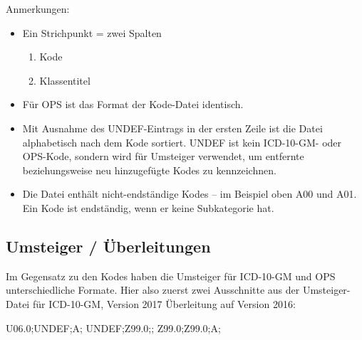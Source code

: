 Anmerkungen: 
\begin{itemize}
\item Ein Strichpunkt = zwei Spalten
\begin{enumerate}
\item Kode
\item Klassentitel
\end{enumerate}
\item Für OPS ist das Format der Kode-Datei identisch.
\item Mit Ausnahme des UNDEF-Eintrags in der ersten Zeile ist die Datei alphabetisch nach dem Kode sortiert. UNDEF ist kein ICD-10-GM- oder OPS-Kode, sondern wird für Umsteiger verwendet, um entfernte beziehungsweise neu hinzugefügte Kodes zu kennzeichnen.
\item Die Datei enthält nicht-endständige Kodes -- im Beispiel oben A00 und A01. Ein Kode ist endständig, wenn er keine Subkategorie hat. \citep[Kategorie und Kode in der ICD-10-GM]{bfarmicdkk}
\end{itemize}

\subsection{Umsteiger / Überleitungen}

Im Gegensatz zu den Kodes haben die Umsteiger für ICD-10-GM und OPS unterschiedliche Formate. Hier also zuerst zwei Ausschnitte aus der Umsteiger-Datei für ICD-10-GM, Version 2017 Überleitung auf Version 2016:

{U06.0;UNDEF;A;\newline
UNDEF;Z99.0;;\newline
Z99.0;Z99.0;A;
}

